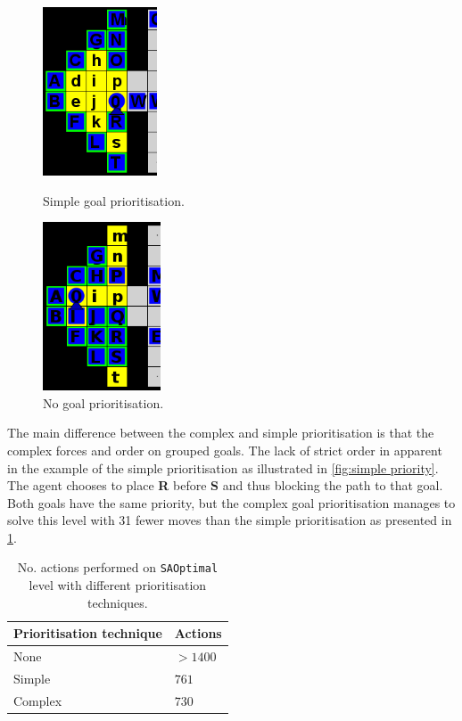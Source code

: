 \begin{figure}[h!]
  \centering
  \begin{minipage}{.45\columnwidth}
    \centering
    \includegraphics[height=5cm]{graphics/simple_priority_block.PNG}
    \caption{\label{fig:simple priority}Simple goal prioritisation.}
  \end{minipage}%
  \hspace{20pt}%
  \begin{minipage}{.45\columnwidth}
    \centering
    \includegraphics[height=5cm]{graphics/no_priority_block.png}
    \caption{\label{fig:no priority}No goal prioritisation.}
  \end{minipage}
\end{figure}

The main difference between the complex and simple prioritisation is that the complex forces and order on grouped goals.
The lack of strict order in apparent in the example of the simple prioritisation as illustrated in \cref{fig:simple priority}.
The agent chooses to place \textbf{R} before \textbf{S} and thus blocking the path to that goal.
Both goals have the same priority, but the complex goal prioritisation manages to solve this level with 31 fewer moves than the simple prioritisation as presented in \cref{tab:SAOptimal_results}.

\begin{table}[h!]
  \centering
  \begin{tabular}{@{}ll@{}}
    \toprule
    Prioritisation technique & Actions \\ 
    \midrule
    None    & $>1400$ \\ 
    Simple  & $761$ \\ 
    Complex & $730$ \\
    \bottomrule
  \end{tabular}
  \caption{\label{tab:SAOptimal_results}No. actions performed on \texttt{SAOptimal} level with different prioritisation techniques.}
\end{table}

